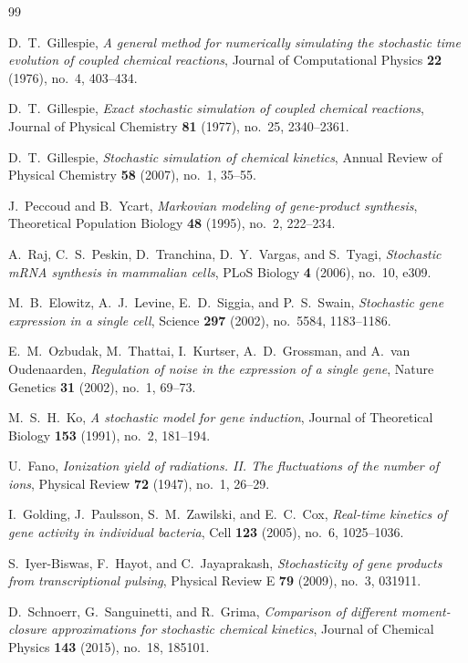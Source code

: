 \documentclass[11pt]{article}
\begin{document}
\begin{thebibliography}{99}

D.~T.~Gillespie,
\textit{A general method for numerically simulating the stochastic time evolution
of coupled chemical reactions},
Journal of Computational Physics \textbf{22} (1976), no.~4, 403--434.

D.~T.~Gillespie,
\textit{Exact stochastic simulation of coupled chemical reactions},
Journal of Physical Chemistry \textbf{81} (1977), no.~25, 2340--2361.

D.~T.~Gillespie,
\textit{Stochastic simulation of chemical kinetics},
Annual Review of Physical Chemistry \textbf{58} (2007), no.~1, 35--55.

J.~Peccoud and B.~Ycart,
\textit{Markovian modeling of gene-product synthesis},
Theoretical Population Biology \textbf{48} (1995), no.~2, 222--234.

A.~Raj, C.~S.~Peskin, D.~Tranchina, D.~Y.~Vargas, and S.~Tyagi,
\textit{Stochastic mRNA synthesis in mammalian cells},
PLoS Biology \textbf{4} (2006), no.~10, e309.

M.~B.~Elowitz, A.~J.~Levine, E.~D.~Siggia, and P.~S.~Swain,
\textit{Stochastic gene expression in a single cell},
Science \textbf{297} (2002), no.~5584, 1183--1186.

E.~M.~Ozbudak, M.~Thattai, I.~Kurtser, A.~D.~Grossman, and A.~van Oudenaarden,
\textit{Regulation of noise in the expression of a single gene},
Nature Genetics \textbf{31} (2002), no.~1, 69--73.

M.~S.~H.~Ko,
\textit{A stochastic model for gene induction},
Journal of Theoretical Biology \textbf{153} (1991), no.~2, 181--194.

U.~Fano,
\textit{Ionization yield of radiations. II. The fluctuations of the number of ions},
Physical Review \textbf{72} (1947), no.~1, 26--29.

I.~Golding, J.~Paulsson, S.~M.~Zawilski, and E.~C.~Cox,
\textit{Real-time kinetics of gene activity in individual bacteria},
Cell \textbf{123} (2005), no.~6, 1025--1036.

S.~Iyer-Biswas, F.~Hayot, and C.~Jayaprakash,
\textit{Stochasticity of gene products from transcriptional pulsing},
Physical Review E \textbf{79} (2009), no.~3, 031911.

D.~Schnoerr, G.~Sanguinetti, and R.~Grima,
\textit{Comparison of different moment-closure approximations for stochastic
chemical kinetics},
Journal of Chemical Physics \textbf{143} (2015), no.~18, 185101.


\end{thebibliography}
\end{document}
